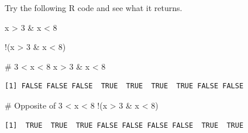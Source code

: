\documentclass[
  letterpaper,
  DIV=11,
  numbers=noendperiod]{scrreprt}
\newenvironment{Shaded}{\begin{snugshade}}{\end{snugshade}}
\newcommand{\CommentTok}[1]{\textcolor[rgb]{0.37,0.37,0.37}{#1}}
\newcommand{\DecValTok}[1]{\textcolor[rgb]{0.68,0.00,0.00}{#1}}
\newcommand{\NormalTok}[1]{\textcolor[rgb]{0.00,0.23,0.31}{#1}}
\newcommand{\SpecialCharTok}[1]{\textcolor[rgb]{0.37,0.37,0.37}{#1}}
\begin{document}
Try the following R code and see what it returns.

\begin{Shaded}
\begin{Highlighting}[]
\NormalTok{x }\SpecialCharTok{\textgreater{}} \DecValTok{3} \SpecialCharTok{\&}\NormalTok{ x }\SpecialCharTok{\textless{}} \DecValTok{8}

\SpecialCharTok{!}\NormalTok{(x }\SpecialCharTok{\textgreater{}} \DecValTok{3} \SpecialCharTok{\&}\NormalTok{ x }\SpecialCharTok{\textless{}} \DecValTok{8}\NormalTok{)}
\end{Highlighting}
\end{Shaded}

\begin{tcolorbox}[enhanced jigsaw, colbacktitle=quarto-callout-tip-color!10!white, opacitybacktitle=0.6, breakable, left=2mm, leftrule=.75mm, toprule=.15mm, toptitle=1mm, bottomtitle=1mm, colframe=quarto-callout-tip-color-frame, opacityback=0, coltitle=black, arc=.35mm, titlerule=0mm, colback=white, bottomrule=.15mm, title=\textcolor{quarto-callout-tip-color}{\faLightbulb}\hspace{0.5em}{Answer}, rightrule=.15mm]

\begin{Shaded}
\begin{Highlighting}[]
\CommentTok{\# 3 \textless{} x \textless{} 8}
\NormalTok{x }\SpecialCharTok{\textgreater{}} \DecValTok{3} \SpecialCharTok{\&}\NormalTok{ x }\SpecialCharTok{\textless{}} \DecValTok{8}
\end{Highlighting}
\end{Shaded}

\begin{verbatim}
[1] FALSE FALSE FALSE  TRUE  TRUE  TRUE  TRUE FALSE FALSE
\end{verbatim}

\begin{Shaded}
\begin{Highlighting}[]
\CommentTok{\# Opposite of 3 \textless{} x \textless{} 8}
\SpecialCharTok{!}\NormalTok{(x }\SpecialCharTok{\textgreater{}} \DecValTok{3} \SpecialCharTok{\&}\NormalTok{ x }\SpecialCharTok{\textless{}} \DecValTok{8}\NormalTok{)}
\end{Highlighting}
\end{Shaded}

\begin{verbatim}
[1]  TRUE  TRUE  TRUE FALSE FALSE FALSE FALSE  TRUE  TRUE
\end{verbatim}

\end{tcolorbox}
\end{document}
